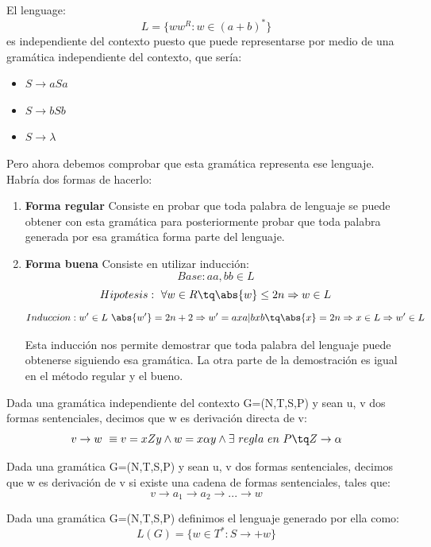 \documentclass{apuntes}
\begin{document}
\begin{example}
El lenguage:
\[L = \lbrace ww^R : w \in (a+b)^*\rbrace\]
es independiente del contexto puesto que puede representarse por medio de una gramática independiente del contexto, que sería:
\begin{itemize}
\item $S \rightarrow aSa$
\item $S \rightarrow bSb$
\item $S \rightarrow \lambda$
\end{itemize}

Pero ahora debemos comprobar que esta gramática representa ese lenguaje. Habría dos formas de hacerlo: 
\begin{enumerate}
\item \textbf{Forma regular}
Consiste en probar que toda palabra de lenguaje se puede obtener con esta gramática para posteriormente probar que toda palabra generada por esa gramática forma parte del lenguaje.

\item \textbf{Forma buena}
Consiste en utilizar inducción:
\[Base: aa, bb \in L\]
\[Hipotesis:\ \forall w \in R \tq \abs{w} \leq 2n \Rightarrow w \in L\]
\[Induccion: w'\in L \ \abs{w'} = 2n+2 \Rightarrow w' = axa | bxb \tq \abs{x} = 2n \Rightarrow x \in L \Rightarrow w' \in L\]

Esta inducción nos permite demostrar que toda palabra del lenguaje puede obtenerse siguiendo esa gramática. La otra parte de la demostración es igual en el método regular y el bueno.
\end{enumerate}
\end{example}

\begin{defn}
Dada una gramática independiente del contexto G=(N,T,S,P) y sean u, v dos formas sentenciales, decimos que w es derivación directa de v:
\[v \rightarrow w\ \equiv v=xZy \wedge w=x\alpha y \wedge \exists \ regla \ en \ P \tq Z \rightarrow \alpha\]
\end{defn}

\begin{defn}[Derivación]
Dada una gramática G=(N,T,S,P) y sean u, v dos formas sentenciales, decimos que w es derivación de v si existe una cadena de formas sentenciales, tales que:
\[v \rightarrow a_1 \rightarrow a_2 \rightarrow ... \rightarrow w\]
\end{defn}

\begin{defn}
Dada una gramática G=(N,T,S,P) definimos el lenguaje generado por ella como:
\[L(G) = \lbrace w \in T^*: S \rightarrow +w \rbrace\]
\end{defn}
\end{document}
